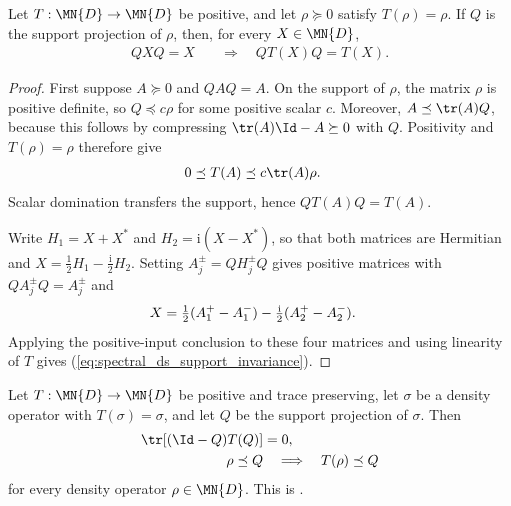 \begin{theorem}%
    \label{thm:stationarySupport_restriction}
    \leanok
    Let $T:\MN{D}\to\MN{D}$ be positive, and let
    $\rho\succeq0$ satisfy $T(\rho)=\rho$. If $Q$ is the support projection
    of $\rho$, then, for every $X\in\MN{D}$,
    \begin{align}
        QXQ=X
         & \quad\Longrightarrow\quad QT(X)Q=T(X).
        \label{eq:spectral_ds_support_invariance}
    \end{align}
\end{theorem}

\begin{proof}
    \leanok
    First suppose $A\succeq0$ and $QAQ=A$. On the support of $\rho$, the
    matrix $\rho$ is positive definite, so $Q\preceq c\rho$ for some
    positive scalar $c$. Moreover, $A\preceq\tr(A)Q$, because this follows
    by compressing $\tr(A)\Id-A\succeq0$ with $Q$. Positivity and
    $T(\rho)=\rho$ therefore give
    \begin{align}
        0
         & \preceq T(A)\preceq c\tr(A)\rho.
        \notag
    \end{align}
    Scalar domination transfers the support, hence $QT(A)Q=T(A)$.

    Write $H_1=X+X^*$ and $H_2=\mathrm{i}(X-X^*)$, so that both matrices
    are Hermitian and $X=\tfrac12H_1-\tfrac{\mathrm{i}}2H_2$. Setting
    $A_j^\pm=QH_j^\pm Q$ gives positive matrices with
    $QA_j^\pm Q=A_j^\pm$ and
    \begin{align}
        X
         & =\tfrac12(A_1^+-A_1^-)
        -\tfrac{\mathrm{i}}2(A_2^+-A_2^-).
        \notag
    \end{align}
    Applying the positive-input conclusion to these four matrices and using
    linearity of $T$ gives (\ref{eq:spectral_ds_support_invariance}).
\end{proof}

\begin{theorem}%
    \label{thm:wolf_stationary_subspaces}
    \leanok
    Let $T:\MN{D}\to\MN{D}$ be positive and trace preserving, let
    $\sigma$ be a density operator with $T(\sigma)=\sigma$, and let $Q$ be
    the support projection of $\sigma$. Then
    \begin{align}
        \tr\!\left[(\Id-Q)T(Q)\right]&=0,
        \label{eq:wolf_stationary_subspace_trace}\\
        \rho\preceq Q&\quad\Longrightarrow\quad T(\rho)\preceq Q
        \label{eq:wolf_stationary_subspace_order}
    \end{align}
    for every density operator $\rho\in\MN{D}$. This is
    \cite[Proposition~6.10]{Wolf2012Quantum}.
\end{theorem}

